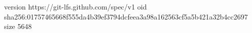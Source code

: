 version https://git-lfs.github.com/spec/v1
oid sha256:01757465668f555da4b39ef3794dcfeea3a98a162563cf5a5b421a32b4cc2697
size 5648
